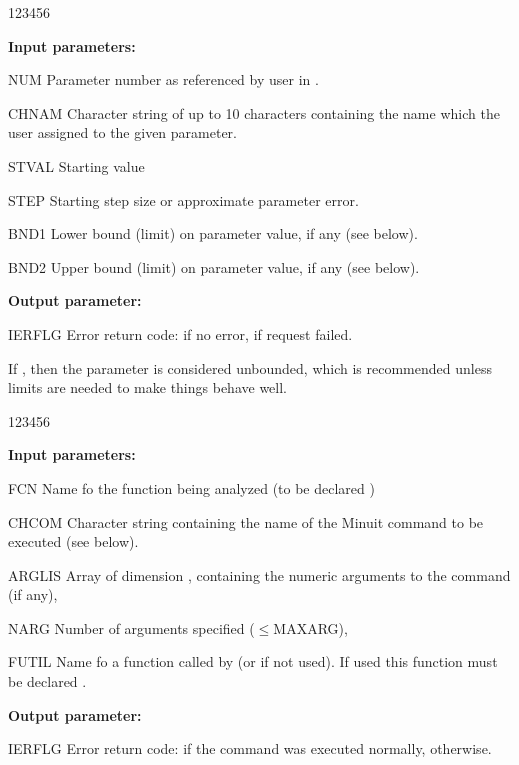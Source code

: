 \begin{DLtt}{123456}
\item[{\rm\bf Input parameters:}]
\item[NUM]    Parameter number as referenced by user in .
\item[CHNAM]  Character string of up to 10 characters containing
              the name which the user assigned to the given parameter.
\item[STVAL]  Starting value
\item[STEP]   Starting step size or approximate parameter error.
\item[BND1]   Lower bound (limit) on parameter value, if any (see below).
\item[BND2]   Upper bound (limit) on parameter value, if any (see below).
\item[{\rm\bf Output parameter:}]
\item[IERFLG] Error return code:  if no error,  if request failed.
\end{DLtt}
 
If , then the parameter is considered unbounded, which
is recommended unless limits are needed to make things behave well.
 
 
 
\begin{DLtt}{123456}
\item[{\rm\bf Input parameters:}]
\item[FCN]    Name fo the function being analyzed (to be declared )
\item[CHCOM]  Character string containing the name of the Minuit
              command to be executed (see below).
\item[ARGLIS] Array of dimension , containing the numeric arguments 
              to the command (if any),
\item[NARG]   Number of arguments specified ($\leq${MAXARG}),
\item[FUTIL]  Name fo a function called by  (or  if not used).
              If used this function must be declared .
\item[{\rm\bf Output parameter:}]
\item[IERFLG] Error return code:  if the command was executed normally, 
               otherwise.
\end{DLtt}
 
